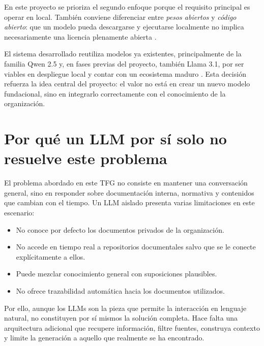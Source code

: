 En este proyecto se prioriza el segundo enfoque porque el requisito principal es operar en local. También conviene diferenciar entre \textit{pesos abiertos} y \textit{código abierto}: que un modelo pueda descargarse y ejecutarse localmente no implica necesariamente una licencia plenamente abierta \cite{meta2024llama31hf,google2024gemmaterms,qwen2024qwen25license}.

El sistema desarrollado reutiliza modelos ya existentes, principalmente de la familia Qwen 2.5 y, en fases previas del proyecto, también Llama 3.1, por ser viables en despliegue local y contar con un ecosistema maduro \cite{meta2024llama31,qwen2024qwen25blog}. Esta decisión refuerza la idea central del proyecto: el valor no está en crear un nuevo modelo fundacional, sino en integrarlo correctamente con el conocimiento de la organización.

\section{Por qué un LLM por sí solo no resuelve este problema}

El problema abordado en este TFG no consiste en mantener una conversación general, sino en responder sobre documentación interna, normativa y contenidos que cambian con el tiempo. Un LLM aislado presenta varias limitaciones en este escenario:

\begin{itemize}
    \item No conoce por defecto los documentos privados de la organización.
    \item No accede en tiempo real a repositorios documentales salvo que se le conecte explícitamente a ellos.
    \item Puede mezclar conocimiento general con suposiciones plausibles.
    \item No ofrece trazabilidad automática hacia los documentos utilizados.
\end{itemize}

Por ello, aunque los LLMs son la pieza que permite la interacción en lenguaje natural, no constituyen por sí mismos la solución completa. Hace falta una arquitectura adicional que recupere información, filtre fuentes, construya contexto y limite la generación a aquello que realmente se ha encontrado.

